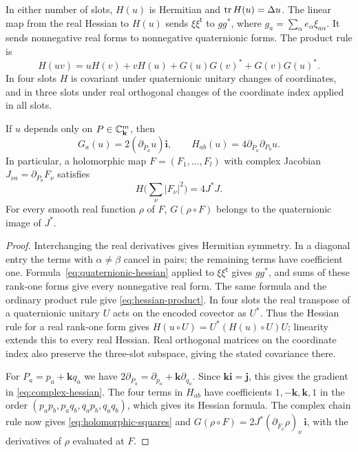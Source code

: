 \begin{lemma}\label{lem:hessian-calculus}
In either number of slots, $H(u)$ is Hermitian and $\operatorname{tr} H(u)=\Delta u$.
The linear map from the real Hessian to $H(u)$ sends
$\xi\xi^{\mathsf t}$ to $gg^*$, where
$g_a=\sum_\alpha e_\alpha\xi_{a\alpha}$. It sends nonnegative
real forms to nonnegative quaternionic forms. The product rule is
\begin{equation}\label{eq:hessian-product}
 H(uv)=uH(v)+vH(u)+G(u)G(v)^*+G(v)G(u)^* .
\end{equation}
In four slots $H$ is covariant under quaternionic unitary changes of
coordinates, and in three slots under real orthogonal changes of the
coordinate index applied in all slots.

If $u$ depends only on $P\in\mathbb C_{\mathbf k}^m$, then
\begin{equation}\label{eq:complex-hessian}
 G_a(u)=2(\partial_{\bar P_a}u)\mathbf i,\qquad
 H_{ab}(u)=4\partial_{\bar P_a}\partial_{P_b}u .
\end{equation}
In particular, a holomorphic map $F=(F_1,\ldots,F_l)$ with complex
Jacobian $J_{\nu a}=\partial_{P_a}F_\nu$ satisfies
\begin{equation}\label{eq:holomorphic-squares}
 H\Big(\sum_\nu|F_\nu|^2\Big)=4J^*J .
\end{equation}
For every smooth real function $\rho$ of $F$,
$G(\rho\circ F)$ belongs to the quaternionic image of $J^*$.
\end{lemma}

\begin{proof}
Interchanging the real derivatives gives Hermitian symmetry. In a
diagonal entry the terms with $\alpha\ne\beta$ cancel in pairs; the
remaining terms have coefficient one. Formula~\eqref{eq:quaternionic-hessian}
applied to $\xi\xi^{\mathsf t}$ gives $gg^*$, and sums of these
rank-one forms give every nonnegative real form. The same formula and
the ordinary product rule give \eqref{eq:hessian-product}.
In four slots the real transpose of a quaternionic unitary $U$ acts
on the encoded covector as $U^*$. Thus the Hessian rule for a real
rank-one form gives $H(u\circ U)=U^*(H(u)\circ U)U$; linearity
extends this to every real Hessian. Real orthogonal matrices on the
coordinate index also preserve the three-slot subspace, giving the
stated covariance there.

For $P_a=p_a+\mathbf k q_a$ we have
$2\partial_{\bar P_a}=\partial_{p_a}+\mathbf k\partial_{q_a}$.
Since $\mathbf k\mathbf i=\mathbf j$, this gives the gradient in
\eqref{eq:complex-hessian}. The four terms in $H_{ab}$ have
coefficients $1,-\mathbf k,\mathbf k,1$ in the order
$(p_ap_b,p_aq_b,q_ap_b,q_aq_b)$, which gives its Hessian formula.
The complex chain rule now gives \eqref{eq:holomorphic-squares} and
$G(\rho\circ F)=2J^*(\partial_{\bar F_\nu}\rho)_\nu\,\mathbf i$,
with the derivatives of $\rho$ evaluated at $F$.
\end{proof}

